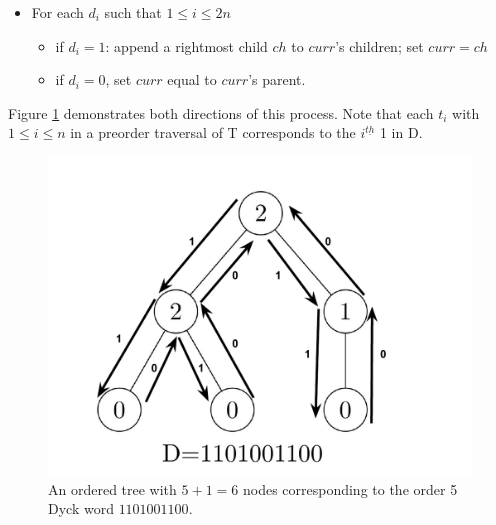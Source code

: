 \begin{itemize}
    \item For each $d_i$ such that $1 \le i \le 2n$ %

	\begin{itemize}
 	\item if $d_i=1$: append a rightmost child $ch$ to $curr$'s children; set $curr=ch$
	\item if $d_i=0$, set $curr$ equal to $curr$'s parent.
 \end{itemize}

\end{itemize}
Figure \ref{ordered_tree_bijection_illustration} demonstrates both directions of this process. Note that each $t_i$ with $1 \le i \le n$ in a preorder traversal of T corresponds to the $i^{\underline{th}}$ 1 in D.

\begin{figure}
    \centering
\includegraphics{Ordered-Tree-Bijection-Illustration}
    \caption{An ordered tree with $5+1=6$ nodes corresponding to the order 5 Dyck word $1101001100$.}
	\label{ordered_tree_bijection_illustration}
\end{figure}


